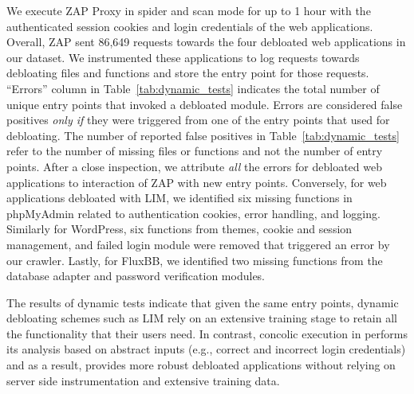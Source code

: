 {We execute ZAP Proxy in spider and scan mode for up to 1 hour with the authenticated session cookies and login credentials of the web applications. 
Overall, ZAP sent 86,649 requests towards the four debloated web applications in our dataset. 
We instrumented these applications to log requests towards debloating files and functions and store the entry point for those requests. 
``Errors'' column  in Table~\ref{tab:dynamic_tests} indicates the total number of unique entry points that invoked a debloated module. 
Errors are considered false positives \emph{only if} they were triggered from one of the entry points that \animatedead{} used for debloating. 
The number of reported false positives in Table~\ref{tab:dynamic_tests} refer to the number of missing files or functions and not the number of entry points. 
After a close inspection, we attribute \emph{all} the errors for \animatedead{} debloated web applications to interaction of ZAP with new entry points. 
Conversely, for web applications debloated with LIM, we identified six missing functions in phpMyAdmin related to authentication cookies, error handling, and logging. 
Similarly for WordPress, six functions from themes, cookie and session management, and failed login module were removed that triggered an error by our crawler. 
Lastly, for FluxBB, we identified two missing functions from the database adapter and password verification modules. 

The results of dynamic tests indicate that given the same entry points, dynamic debloating schemes such as LIM rely on an extensive training stage to retain all the functionality that their users need. 
In contrast, concolic execution in \animatedead{} performs its analysis based on abstract inputs (e.g., correct and incorrect login credentials) and as a result, provides more robust debloated applications without relying on server side instrumentation and extensive training data. 

}
